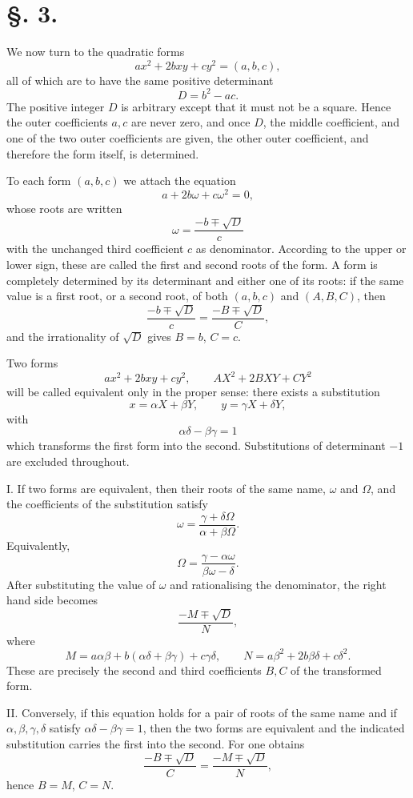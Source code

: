 \documentclass[11pt]{article}
\begin{document}
\section*{\S. 3.}

We now turn to the quadratic forms
\[
 ax^2+2bxy+cy^2=(a,b,c),
\]
all of which are to have the same positive determinant
\[
 D=b^2-ac.
\]
The positive integer $D$ is arbitrary except that it must not be a square. Hence the outer coefficients $a,c$ are never zero, and once $D$, the middle coefficient, and one of the two outer coefficients are given, the other outer coefficient, and therefore the form itself, is determined.

To each form $(a,b,c)$ we attach the equation
\[
 a+2b\omega+c\omega^2=0,
\]
whose roots are written
\[
 \omega=\frac{-b\mp\sqrt D}{c}
\]
with the unchanged third coefficient $c$ as denominator. According to the upper or lower sign, these are called the first and second roots of the form. A form is completely determined by its determinant and either one of its roots: if the same value is a first root, or a second root, of both $(a,b,c)$ and $(A,B,C)$, then
\[
 \frac{-b\mp\sqrt D}{c}=\frac{-B\mp\sqrt D}{C},
\]
and the irrationality of $\sqrt D$ gives $B=b$, $C=c$.

Two forms
\[
 ax^2+2bxy+cy^2,
 \qquad
 AX^2+2BXY+CY^2
\]
will be called equivalent only in the proper sense: there exists a substitution
\[
 x=\alpha X+\beta Y,
 \qquad
 y=\gamma X+\delta Y,
\]
with
\[
 \alpha\delta-
\beta\gamma=1
\]
which transforms the first form into the second. Substitutions of determinant $-1$ are excluded throughout.

I. If two forms are equivalent, then their roots of the same name, $\omega$ and $\Omega$, and the coefficients of the substitution satisfy
\[
 \omega=\frac{\gamma+\delta\Omega}{\alpha+\beta\Omega}.
\]
Equivalently,
\[
 \Omega=\frac{\gamma-
\alpha\omega}{\beta\omega-
\delta}.
\]
After substituting the value of $\omega$ and rationalising the denominator, the right hand side becomes
\[
 \frac{-M\mp\sqrt D}{N},
\]
where
\[
 M=a\alpha\beta+b(\alpha\delta+\beta\gamma)+c\gamma\delta,
 \qquad
 N=a\beta^2+2b\beta\delta+c\delta^2.
\]
These are precisely the second and third coefficients $B,C$ of the transformed form.

II. Conversely, if this equation holds for a pair of roots of the same name and if $\alpha,\beta,\gamma,\delta$ satisfy $\alpha\delta-\beta\gamma=1$, then the two forms are equivalent and the indicated substitution carries the first into the second. For one obtains
\[
 \frac{-B\mp\sqrt D}{C}=\frac{-M\mp\sqrt D}{N},
\]
hence $B=M$, $C=N$.
\end{document}
